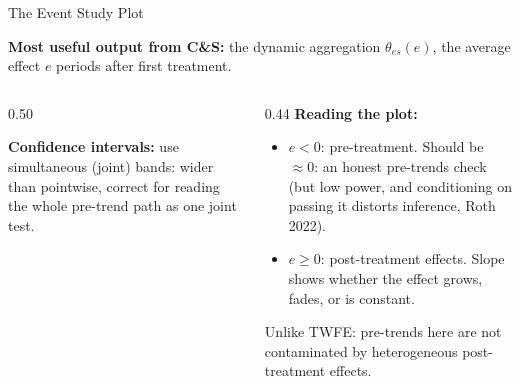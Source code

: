 \documentclass[main.tex]{subfiles}
\begin{document}
\begin{frame}{The Event Study Plot}

  \textbf{Most useful output from C\&S:} the dynamic aggregation
  $\theta_{\mathit{es}}(e)$, the average effect $e$ periods after first
  treatment.

  \medskip
  \begin{columns}[T]
    \begin{column}{0.50\textwidth}

      \vspace{0.5cm}
      \footnotesize
      \textbf{Confidence intervals:} use simultaneous (joint)
      bands: wider than pointwise, correct for reading the whole
      pre-trend path as one joint test.
    \end{column}
    \begin{column}{0.44\textwidth}
      \small
      \textbf{Reading the plot:}
      \begin{itemize}
        \item $e < 0$: pre-treatment. Should be $\approx 0$: an
          honest pre-trends check (but low power, and conditioning on
          passing it distorts inference, Roth 2022).
        \item $e \geq 0$: post-treatment effects. Slope shows
          whether the effect grows, fades, or is constant.
      \end{itemize}

      \medskip
      \alert{Unlike TWFE:} pre-trends here are not contaminated
      by heterogeneous post-treatment effects.
    \end{column}
  \end{columns}

\end{frame}
\end{document}
